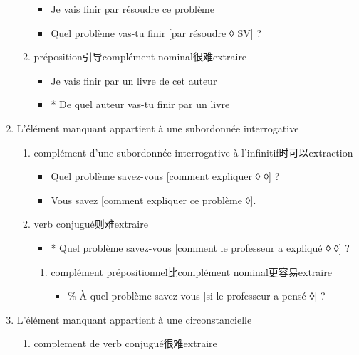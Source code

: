 \documentclass[UTF8]{report}
\begin{document}
\begin{enumerate}
\begin{enumerate}
        \begin{itemize}
            \item Je vais finir par résoudre ce problème
            \item Quel problème vas-tu finir [par résoudre ◊ SV] ?
        \end{itemize}
        \item préposition引导complément nominal很难extraire
        \begin{itemize}
            \item Je vais finir par un livre de cet auteur
            \item * De quel auteur vas-tu finir par un livre
        \end{itemize}
    \end{enumerate}
    \item L’élément manquant appartient à une subordonnée interrogative
    \begin{enumerate}
        \item complément d’une subordonnée interrogative à l’infinitif时可以extraction
        \begin{itemize}
            \item Quel problème savez-vous [comment expliquer ◊ ◊] ?
            \item Vous savez [comment expliquer ce problème ◊].
        \end{itemize}
        \item verb conjugué则难extraire
        \begin{itemize}
            \item * Quel problème savez-vous [comment le professeur a expliqué ◊ ◊] ?
        \end{itemize}
        \begin{enumerate}
            \item complément prépositionnel比complément nominal更容易extraire
            \begin{itemize}
                \item \% À quel problème savez-vous [si le professeur a pensé ◊] ?
            \end{itemize}
        \end{enumerate}
    \end{enumerate}
    \item L’élément manquant appartient à une circonstancielle
    \begin{enumerate}
        \item complement de verb conjugué很难extraire

\end{enumerate}
\end{enumerate}
\end{document}
